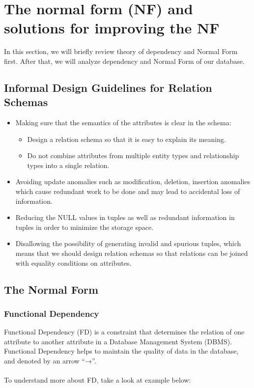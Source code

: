\documentclass[12pt,a4paper]{article}
\begin{document}
\section{The normal form (NF) and solutions for improving the NF}
In this section, we will briefly review theory of dependency and Normal Form first. After that, we will analyze dependency and Normal Form of our database.
\subsection{Informal Design Guidelines for Relation Schemas}
\begin{itemize}
    \item Making sure that the semantics of the attributes is clear in the schema:
    \begin{itemize}
        \item Design a relation schema so that it is easy to explain its meaning.
        \item Do not combine attributes from multiple entity types and relationship types into a single relation.
    \end{itemize}
    \item Avoiding update anomalies such as modification, deletion, insertion anomalies which cause redundant work to be done and may lead to accidental loss of information.
    \item Reducing the NULL values in tuples as well as redundant information in tuples in order to minimize the storage space.  
    \item Disallowing the possibility of generating invalid and spurious tuples, which means that we should design relation schemas so that relations can be joined with equality conditions on attributes.
\end{itemize}

\subsection{The Normal Form}
\subsubsection{Functional Dependency}
\indent Functional Dependency (FD) is a constraint that determines the relation of one attribute to another attribute in a Database Management System (DBMS). Functional Dependency helps to maintain the quality of data in the database, and denoted by an arrow “→”. \\\\
\indent To understand more about FD, take a look at example below:
\end{document}
